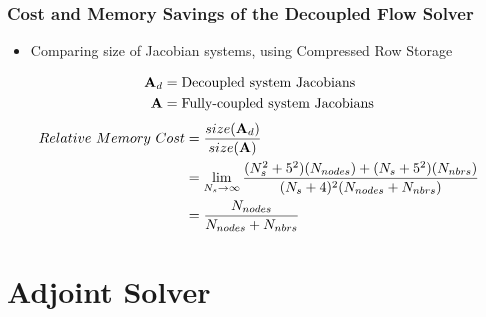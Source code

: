 \documentclass{beamer}
\begin{document}
\begin{frame}
  \frametitle{Cost and Memory Savings of the Decoupled Flow Solver}
  \begin{itemize}
    \item Comparing size of Jacobian systems, using Compressed Row Storage
  \end{itemize}
  \begin{align*}
    \mathbf A_d &= \text{Decoupled system Jacobians} \\
    \mathbf A &= \text{Fully-coupled system Jacobians}
  \end{align*}
  \[
  \begin{split} Relative\ Memory\ Cost &=
    \frac{size(\mathbf A_d)}{size(\mathbf A)} \\ &= \lim_{N_s\to\infty}
    \frac{(N_s^2+5^2)(N_{nodes})+(N_s+5^2)(N_{nbrs})}{(N_s+4)^2(N_{nodes}+N_{nbrs})} \\
    &= \frac{N_{nodes}}{N_{nodes} + N_{nbrs}}
  \end{split}
  \]
\end{frame}


\section{Adjoint Solver}
\end{document}
